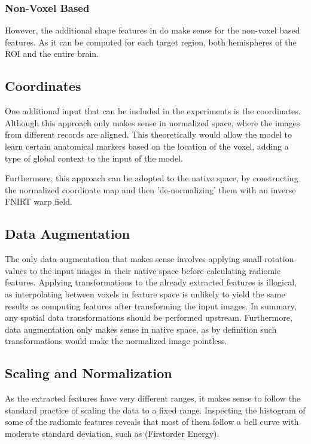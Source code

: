 \subsubsection{Non-Voxel Based}

However, the additional shape features in  do make sense for the non-voxel based features. As it can be computed for each target region, both hemispheres of the \ac{ROI} and the entire brain.

\subsection{Coordinates}

One additional input that can be included in the experiments is the coordinates. Although this approach only makes sense in normalized space, where the images from different records are aligned. This theoretically would allow the model to learn certain anatomical markers based on the location of the voxel, adding a type of global context to the input of the model.\par
Furthermore, this approach can be adopted to the native space, by constructing the normalized coordinate map and then 'de-normalizing' them with an inverse \ac{FNIRT} warp field.

\subsection{Data Augmentation}

The only data augmentation that makes sense involves applying small rotation values to the input images in their native space before calculating radiomic features. Applying transformations to the already extracted features is illogical, as interpolating between voxels in feature space is unlikely to yield the same results as computing features after transforming the input images. In summary, any spatial data transformations should be performed upstream. Furthermore, data augmentation only makes sense in native space, as by definition such transformations would make the normalized image pointless.

\subsection{Scaling and Normalization}

As the extracted features have very different ranges, it makes sense to follow the standard practice of scaling the data to a fixed range. Inspecting the histogram of some of the radiomic features reveals that most of them follow a bell curve with moderate standard deviation, such as  (Firstorder Energy).\par

